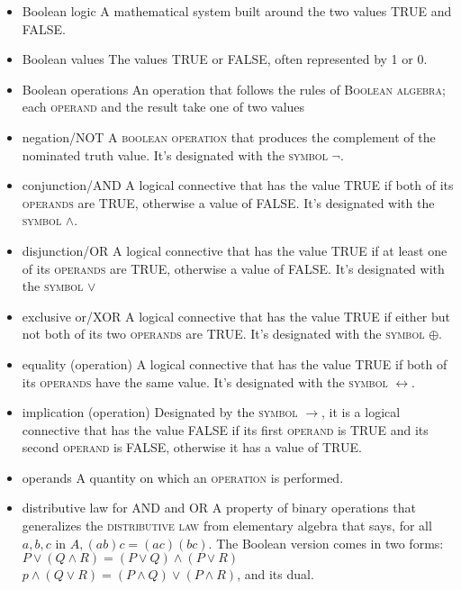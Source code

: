 \documentclass{article}
\newcommand{\term}[1]{\textsc{#1}}
\begin{document}
\bigskip \indent
\begin{itemize}
\item Boolean logic
  \subitem A mathematical system built around the two values TRUE and FALSE.

\item Boolean values
   \subitem The values TRUE or FALSE, often represented by 1 or 0.

\item Boolean operations
  \subitem An operation that follows the rules of \term{Boolean algebra}; each \term{operand} and the result take one of two values

\item negation/NOT 
   \subitem A \term{boolean operation} that produces the complement of the nominated truth value. It's designated with the \term{symbol} $\neg$.
   
\item conjunction/AND
   \subitem  A logical connective that has the value TRUE if both of its \term{operands} are TRUE, otherwise a value of FALSE. It's designated with the \term{symbol}  $\wedge$.

\item disjunction/OR 
   \subitem A  logical connective that has the value TRUE if at least one of its \term{operands} are TRUE, otherwise a value of FALSE. It's designated with the \term{symbol}  $\vee$

\item exclusive or/XOR 
   \subitem A  logical connective that has the value TRUE if either but not both of its two \term{operands} are TRUE. It's designated with the \term{symbol} $\oplus$.

\item equality (operation) 
   \subitem A logical connective that has the value TRUE if both of its \term{operands} have the same value. It's designated with the \term{symbol} $\leftrightarrow$.

\item implication (operation) 
   \subitem Designated by the \term{symbol} $\rightarrow$, it is a logical connective that has the value FALSE if its first \term{operand} is TRUE and its second \term{operand} is FALSE, otherwise it has a value of TRUE.

\item operands
   \subitem A quantity on which an \term{operation} is performed.

\item distributive law for AND and OR
   \subitem A property of binary operations that generalizes the \term{distributive law} from elementary algebra that says, for all $a, b, c$ in $A, (a b) c = (a c) (b c)$. The Boolean version comes in two forms: 
   \subitem $P \vee (Q \wedge R) = (P \vee Q) \wedge (P \vee R)$
   \subitem $p \wedge (Q \vee R) = (P \wedge Q) \vee (P \wedge R)$, and its dual.

\end{itemize}
\end{document}
